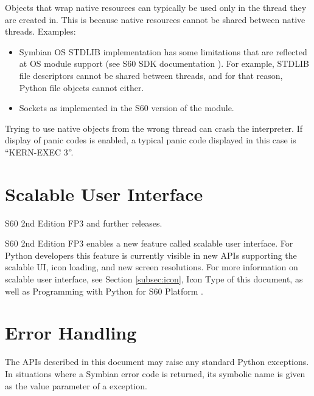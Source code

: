 Objects that wrap native resources can typically be used only in the
thread they are created in.  This is because native resources cannot
be shared between native threads. Examples:

\begin{notice}[note]
\begin{itemize}
\item Symbian OS STDLIB implementation has some limitations that are reflected at OS module support (see S60 SDK documentation \cite{S60Doc}). For example, STDLIB file descriptors cannot be shared between threads, and for that reason, Python file objects cannot either. 
\item Sockets as implemented in the S60 version of the  module.
\end{itemize}
\end{notice}

\begin{notice}[warning]
Trying to use native objects from the wrong thread can crash the
interpreter.  If display of panic codes is enabled, a typical panic
code displayed in this case is ``KERN-EXEC 3''.
\end{notice}

\section{Scalable User Interface}
\label{sec:scalable}

\begin{notice}[note]
S60 2nd Edition FP3 and further releases.
\end{notice}

S60 2nd Edition FP3 enables a new feature called scalable user interface. 
For Python developers this feature is currently visible in new APIs 
supporting the scalable UI, icon loading, and new screen resolutions. For more 
information on scalable user interface, see Section \ref{subsec:icon}, Icon Type 
of this document, as well as Programming with Python for S60 Platform 
\cite{PyS60Prog}. 

\section{Error Handling}
\label{subsec:error}

The APIs described in this document may raise any standard Python 
exceptions. In situations where a Symbian error code is returned, its 
symbolic name is given as the value parameter of a  
exception.

